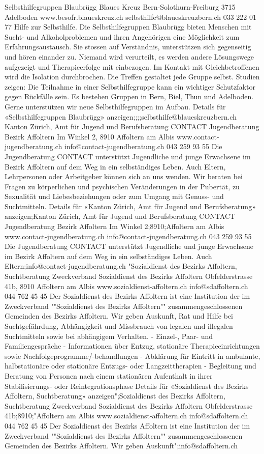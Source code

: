 Selbsthilfegruppen Blaubrügg Blaues Kreuz Bern-Solothurn-Freiburg 3715 Adelboden www.besofr.blaueskreuz.ch selbsthilfe@blaueskreuzbern.ch 033 222 01 77 Hilfe zur Selbsthilfe. Die Selbsthilfegruppen Blaubrügg bieten Menschen mit Sucht- und Alkoholproblemen und ihren Angehörigen eine Möglichkeit zum Erfahrungsaustausch. Sie stossen auf Verständnis, unterstützen sich gegenseitig und hören einander zu. Niemand wird verurteilt, es werden andere Lösungswege aufgezeigt und Therapieerfolge mit einbezogen. Im Kontakt mit Gleichbetroffenen wird die Isolation durchbrochen. Die Treffen gestaltet jede Gruppe selbst. Studien zeigen: Die Teilnahme in einer Selbsthilfegruppe kann ein wichtiger Schutzfaktor gegen Rückfälle sein. Es bestehen Gruppen in Bern, Biel, Thun und Adelboden. Gerne unterstützen wir neue Selbsthilfegruppen im Aufbau. Details für «Selbsthilfegruppen Blaubrügg» anzeigen;;;;selbsthilfe@blaueskreuzbern.ch
Kanton Zürich, Amt für Jugend und Berufsberatung CONTACT Jugendberatung Bezirk Affoltern Im Winkel 2, 8910 Affoltern am Albis www.contact-jugendberatung.ch info@contact-jugendberatung.ch 043 259 93 55 Die Jugendberatung CONTACT unterstützt Jugendliche und junge Erwachsene im Bezirk Affoltern auf dem Weg in ein selbständiges Leben. Auch Eltern, Lehrpersonen oder Arbeitgeber können sich an uns wenden. Wir beraten bei Fragen zu körperlichen und psychischen Veränderungen in der Pubertät, zu Sexualität und Liebesbeziehungen oder zum Umgang mit Genuss- und Suchtmitteln. Details für «Kanton Zürich, Amt für Jugend und Berufsberatung» anzeigen;Kanton Zürich, Amt für Jugend und Berufsberatung CONTACT Jugendberatung Bezirk Affoltern Im Winkel 2;8910;Affoltern am Albis www.contact-jugendberatung.ch info@contact-jugendberatung.ch 043 259 93 55 Die Jugendberatung CONTACT unterstützt Jugendliche und junge Erwachsene im Bezirk Affoltern auf dem Weg in ein selbständiges Leben. Auch Eltern;info@contact-jugendberatung.ch
"Sozialdienst des Bezirks Affoltern, Suchtberatung Zweckverband Sozialdienst des Bezirks Affoltern Obfelderstrasse 41b, 8910 Affoltern am Albis www.sozialdienst-affoltern.ch info@sdaffoltern.ch 044 762 45 45 Der Sozialdienst des Bezirks Affoltern ist eine Institution der im Zweckverband ""Sozialdienst des Bezirks Affoltern"" zusammengeschlossenen Gemeinden des Bezirks Affoltern. Wir geben Auskunft, Rat und Hilfe bei Suchtgefährdung, Abhängigkeit und Missbrauch von legalen und illegalen Suchtmitteln sowie bei abhängigem Verhalten. - Einzel-, Paar- und Familiengespräche - Informationen über Entzug, stationäre Therapieeinrichtungen sowie Nachfolgeprogramme/-behandlungen - Abklärung für Eintritt in ambulante, halbstationäre oder stationäre Entzugs- oder Langzeittherapien - Begleitung und Beratung von Personen nach einem stationären Aufenthalt in ihrer Stabilisierungs- oder Reintegrationsphase Details für «Sozialdienst des Bezirks Affoltern, Suchtberatung» anzeigen";Sozialdienst des Bezirks Affoltern, Suchtberatung Zweckverband Sozialdienst des Bezirks Affoltern Obfelderstrasse 41b;8910;"Affoltern am Albis www.sozialdienst-affoltern.ch info@sdaffoltern.ch 044 762 45 45 Der Sozialdienst des Bezirks Affoltern ist eine Institution der im Zweckverband ""Sozialdienst des Bezirks Affoltern"" zusammengeschlossenen Gemeinden des Bezirks Affoltern. Wir geben Auskunft";info@sdaffoltern.ch
